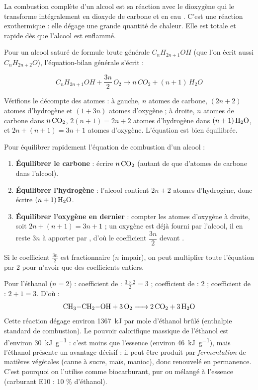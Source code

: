 \documentclass[11pt]{article}
\newcommand{\cle}[1]{{\popxbold\color{popdark}#1}}
\begin{document}
\begin{definition}
La \cle{combustion complète} d'un alcool est sa réaction avec le dioxygène  qui le transforme intégralement en \cle{dioxyde de carbone}  et en \cle{eau} . C'est une réaction \cle{exothermique} : elle dégage une grande quantité de chaleur. Elle est totale et rapide dès que l'alcool est enflammé.
\end{definition}

Pour un alcool saturé de formule brute générale $C_nH_{2n+1}OH$ (que l'on écrit aussi $C_nH_{2n+2}O$), l'équation-bilan générale s'écrit :

\[ C_nH_{2n+1}OH + \frac{3n}{2}\, O_2 \longrightarrow n\, CO_2 + (n+1)\, H_2O \]

Vérifions le décompte des atomes : à gauche, $n$ atomes de carbone, $(2n+2)$ atomes d'hydrogène et $(1 + 3n)$ atomes d'oxygène ; à droite, $n$ atomes de carbone dans $n\,\ce{CO2}$, $2(n+1) = 2n+2$ atomes d'hydrogène dans $(n+1)\,\ce{H2O}$, et $2n + (n+1) = 3n+1$ atomes d'oxygène. L'équation est bien équilibrée.

\begin{methode}
Pour équilibrer rapidement l'équation de combustion d'un alcool :
\begin{enumerate}
\item \textbf{Équilibrer le carbone} : écrire $n\,\ce{CO2}$ (autant de  que d'atomes de carbone dans l'alcool).
\item \textbf{Équilibrer l'hydrogène} : l'alcool contient $2n+2$ atomes d'hydrogène, donc écrire $(n+1)\,\ce{H2O}$.
\item \textbf{Équilibrer l'oxygène en dernier} : compter les atomes d'oxygène à droite, soit $2n + (n+1) = 3n+1$ ; un oxygène est déjà fourni par l'alcool, il en reste $3n$ à apporter par , d'où le coefficient $\dfrac{3n}{2}$ devant .
\end{enumerate}
Si le coefficient $\frac{3n}{2}$ est fractionnaire ($n$ impair), on peut multiplier toute l'équation par 2 pour n'avoir que des coefficients entiers.
\end{methode}

\begin{exemplebox}
Pour l'éthanol  ($n = 2$) : coefficient de  : $\frac{3 \times 2}{2} = 3$ ; coefficient de  : $2$ ; coefficient de  : $2+1 = 3$. D'où :
\[ \ce{CH3-CH2-OH + 3 O2 -> 2 CO2 + 3 H2O} \]
Cette réaction dégage environ \SI{1367}{kJ} par mole d'éthanol brûlé (enthalpie standard de combustion). Le pouvoir calorifique massique de l'éthanol est d'environ \SI{30}{kJ.g^{-1}} : c'est moins que l'essence (environ \SI{46}{kJ.g^{-1}}), mais l'éthanol présente un avantage décisif : il peut être produit par \emph{fermentation} de matières végétales (canne à sucre, maïs, manioc), donc renouvelé en permanence. C'est pourquoi on l'utilise comme \cle{biocarburant}, pur ou mélangé à l'essence (carburant E10 : 10 \% d'éthanol).
\end{exemplebox}
\end{document}
